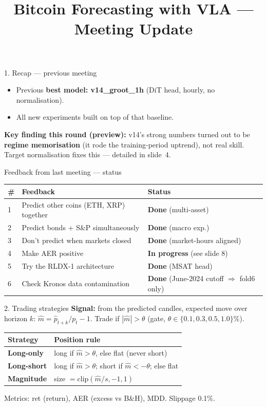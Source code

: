 \documentclass[aspectratio=169]{beamer}
\title{Bitcoin Forecasting with VLA --- Meeting Update}\date{}
\begin{document}
\frame{\titlepage}
\begin{frame}{1. Recap --- previous meeting}
\large
\begin{itemize}
\item Previous \textbf{best model: v14\_groot\_1h} (DiT head, hourly, no normalisation).
\item All new experiments built on top of that baseline.
\end{itemize}
\vspace{1em}
\normalsize
\textbf{Key finding this round (preview):} v14's strong numbers turned out to be
\textbf{regime memorisation} (it rode the training-period uptrend), not real skill.
Target normalisation fixes this --- detailed in slide~4.
\end{frame}
\begin{frame}{Feedback from last meeting --- status}
\small
\begin{center}\begin{tabular}{lll}
\toprule
\# & Feedback & Status \\ \midrule
1 & Predict other coins (ETH, XRP) together & \textcolor{ok}{\textbf{Done}} (multi-asset) \\
2 & Predict bonds + S\&P simultaneously & \textcolor{ok}{\textbf{Done}} (macro exp.) \\
3 & Don't predict when markets closed & \textcolor{ok}{\textbf{Done}} (market-hours aligned) \\
4 & Make AER positive & \textcolor{wip}{\textbf{In progress}} (see slide 8) \\
5 & Try the RLDX-1 architecture & \textcolor{ok}{\textbf{Done}} (MSAT head) \\
6 & Check Kronos data contamination & \textcolor{ok}{\textbf{Done}} (June-2024 cutoff $\Rightarrow$ fold6 only) \\
\bottomrule
\end{tabular}\end{center}
\end{frame}
\begin{frame}{2. Trading strategies}
\small
\textbf{Signal:} from the predicted candles, expected move over horizon $k$: $\hat m=\hat p_{t+k}/p_t-1$. Trade if $|\hat m|>\theta$ (gate, $\theta\in\{0.1,0.3,0.5,1.0\}\%$).
\vspace{.6ex}
\begin{center}\begin{tabular}{ll}
\toprule
Strategy & Position rule \\ \midrule
\textbf{Long-only} & long if $\hat m>\theta$, else flat (never short) \\
\textbf{Long-short} & long if $\hat m>\theta$; short if $\hat m<-\theta$; else flat \\
\textbf{Magnitude} & size $=\mathrm{clip}(\hat m/s,-1,1)$ \\
\bottomrule
\end{tabular}\end{center}
\vspace{.4ex}
\footnotesize Metrics: ret (return), AER (excess vs B\&H), MDD. Slippage 0.1\%.
\end{frame}
\end{document}
